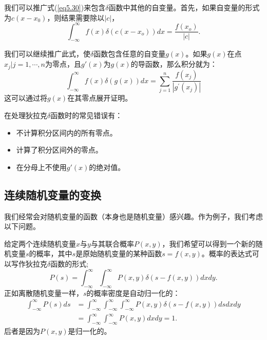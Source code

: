 \documentclass[UTF8]{ctexart}
\numberwithin{equation}{section}%
\numberwithin{figure}{section}%
\begin{document}
    我们可以推广式(\ref{eq5.30})来包含$\delta$函数中其他的自变量。首先，如果自变量的形式为$c(x-x_0)$，则结果需要除以$|c|$，
    \begin{equation}
        \int_{-\infty}^{\infty} f(x) \delta\left(c\left(x-x_{o}\right)\right) d x=\frac{f\left(x_{o}\right)}{|c|} .
        \end{equation}

    我们可以继续推广此式，使$\delta$函数包含任意的自变量$g(x)$。如果$g(x)$在点${x_j|j=1,\cdots,n}$为零点，且$g'(x)$为$g(x)$的导函数，那么积分就为：
    \begin{equation}
        \int_{-\infty}^{\infty} f(x) \delta(g(x)) d x=\sum_{j=1}^{n} \frac{f\left(x_{j}\right)}{\left|g^{\prime}\left(x_{j}\right)\right|}
        \end{equation}
    这可以通过将$g(x)$在其零点展开证明。
    \begin{mdframed}[backgroundcolor=lightgray,hidealllines=true]
    在处理狄拉克$\delta$函数时的常见错误有：\\
    \begin{itemize}
        \item 不计算积分区间内的所有零点。
        \item 计算了积分区间外的零点。
        \item 在分母上不使用$g'(x)$的绝对值。
    \end{itemize}
    \end{mdframed}
    \subsection{连续随机变量的变换}\label{sec5.4}
    我们经常会对随机变量的函数（本身也是随机变量）感兴趣。作为例子，我们考虑以下问题。

    给定两个连续随机变量$x$与$y$与其联合概率$P(x,y)$，我们希望可以得到一个新的随机变量$s$的概率，其中$s$是原始随机变量的某种函数$s=f(x,y)$。概率的表达式可以写作狄拉克$\delta$函数的形式;
    \begin{equation}\label{eq5.33}
        P(s)=\int_{-\infty}^{\infty} \int_{-\infty}^{\infty} P(x, y) \delta(s-f(x, y)) d x d y .
    \end{equation}
    正如离散随机变量一样，$s$的概率密度是自动归一化的：
    \begin{equation}
        \begin{aligned}
            \int_{-\infty}^{\infty} P(s) d s &=\int_{-\infty}^{\infty} \int_{-\infty}^{\infty} \int_{-\infty}^{\infty} P(x, y) \delta(s-f(x, y)) d s d x d y \\
            &=\int_{-\infty}^{\infty} \int_{-\infty}^{\infty} P(x, y) d x d y=1 .
            \end{aligned}
    \end{equation}
    后者是因为$P(x,y)$是归一化的。
\end{document}
